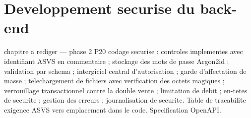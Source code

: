﻿%
\chapter{Developpement securise du back-end}
\label{chap:dev-securise}

\begin{constat}{chapitre a rediger --- phase 2}
P20 codage securise : controles implementes avec identifiant ASVS en commentaire ; stockage des mots de passe Argon2id ; validation par schema ; intergiciel central d'autorisation ; garde d'affectation de masse ; telechargement de fichiers avec verification des octets magiques ; verrouillage transactionnel contre la double vente ; limitation de debit ; en-tetes de securite ; gestion des erreurs ; journalisation de securite. Table de tracabilite exigence ASVS vers emplacement dans le code. Specification OpenAPI.
\end{constat}
